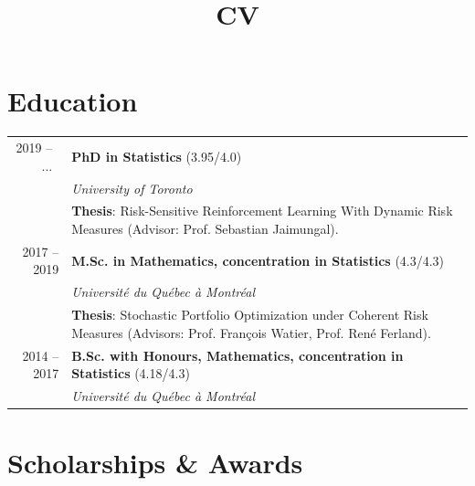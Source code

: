 \documentclass[11pt, sans]{moderncv}
\title{CV}
\begin{document}

\makecvtitle

\vspace*{-30pt}


\section{Education  }

\begin{longtable}{rp{13.34cm}}
	2019 -- $\,$ ... $\,$ \hspace{10pt}&\textbf{PhD in Statistics} (3.95/4.0)\\
	&\textit{University of Toronto}\\
	&{\small \textbf{Thesis}: Risk-Sensitive Reinforcement Learning With Dynamic Risk Measures (Advisor: Prof. Sebastian Jaimungal).}\vspace{5pt}\\
    2017 -- 2019 \hspace{10pt}&\textbf{M.Sc. in Mathematics, concentration in Statistics} (4.3/4.3) \\
    &\textit{Université du Québec à Montréal}\\
    &{\small \textbf{Thesis}: Stochastic Portfolio Optimization under Coherent Risk Measures (Advisors: Prof. François Watier, Prof. René Ferland).}\vspace{5pt}\\
    2014 -- 2017 \hspace{10pt}& \textbf{B.Sc. with Honours, Mathematics, concentration in Statistics} (4.18/4.3)\\
    &\textit{Université du Québec à Montréal}
\end{longtable}


\section{Scholarships \& Awards  }
\end{document}
